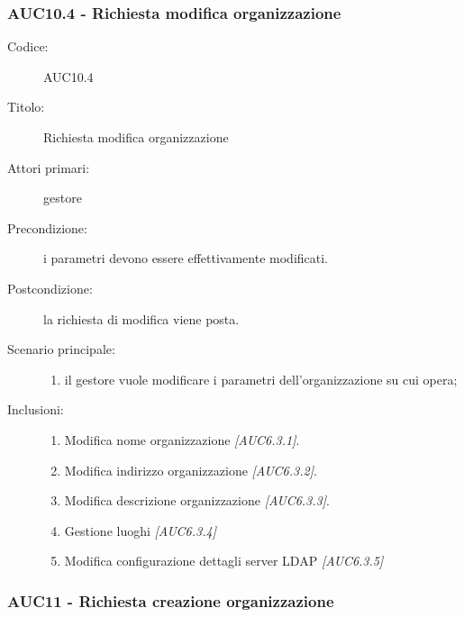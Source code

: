 \documentclass[casi-duso]{subfiles}
\begin{document}
\subsubsection{AUC10.4 - Richiesta modifica organizzazione}%
\label{subsub:AUC10.4}
\begin{description}
  \item[Codice:] AUC10.4
  \item[Titolo:] Richiesta modifica organizzazione
  \item[Attori primari:] gestore
  \item[Precondizione:] i parametri devono essere effettivamente modificati.
  \item[Postcondizione:] la richiesta di modifica viene posta.
  \item[Scenario principale:]
  \begin{enumerate}
    \item il gestore vuole modificare i parametri dell'organizzazione su cui opera;
  \end{enumerate}
  \item[Inclusioni:]
  \begin{enumerate}
    \item Modifica nome organizzazione \emph{[AUC6.3.1]}.
    \item Modifica indirizzo organizzazione \emph{[AUC6.3.2]}.
    \item Modifica descrizione organizzazione \emph{[AUC6.3.3]}.
    \item Gestione luoghi \emph{[AUC6.3.4]} 
    \item Modifica configurazione dettagli server LDAP \emph{[AUC6.3.5]} 
  \end{enumerate}
\end{description}

\subsubsection{AUC11 - Richiesta creazione organizzazione}%
\label{subsub:AUC11}
\end{document}
